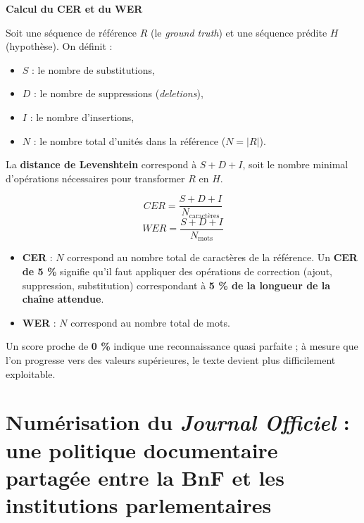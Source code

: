 \begin{encadre}
\textbf{Calcul du CER et du WER}

Soit une séquence de référence \( R \) (le \emph{ground truth}) et une séquence prédite \( H \) (hypothèse).
On définit :

\begin{itemize}
\item \( S \) : le nombre de substitutions,
\item \( D \) : le nombre de suppressions (\emph{deletions}),
\item \( I \) : le nombre d’insertions,
\item \( N \) : le nombre total d’unités dans la référence (\( N = |R| \)).

\end{itemize}
La \textbf{distance de Levenshtein} correspond à \( S + D + I \), soit le nombre minimal d’opérations nécessaires pour transformer \( R \) en \( H \).

\[
CER = \frac{S + D + I}{N_{\text{caractères}}}
\]
\[
WER = \frac{S + D + I}{N_{\text{mots}}}
\]

\begin{itemize}
\item \textbf{CER} : \( N \) correspond au nombre total de caractères de la référence. Un \textbf{CER de 5 \%} signifie qu’il faut appliquer des opérations de correction (ajout, suppression, substitution) correspondant à \textbf{5 \% de la longueur de la chaîne attendue}.
\item \textbf{WER} : \( N \) correspond au nombre total de mots.

\end{itemize}
Un score proche de \textbf{0 \%} indique une reconnaissance quasi parfaite ; à mesure que l’on progresse vers des valeurs supérieures, le texte devient plus difficilement exploitable.

\end{encadre}
\section{Numérisation du \emph{Journal Officiel} : une politique documentaire partagée entre la BnF et les institutions parlementaires}

